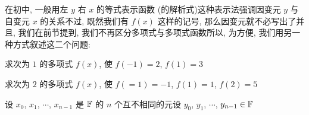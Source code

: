 在初中, 一般用左 $y$ 右 $x$ 的等式表示函数 (的解析式)\period 这种表示法强调因变元  $y$ 与自变元  $x$ 的关系\period 不过, 既然我们有 $f(x)$ 这样的记号, 那么因变元就不必写出了\period 并且, 我们在前节提到, 我们不再区分多项式与多项式函数\period 所以, 为方便, 我们用另一种方式叙述这二个问题:

\begin{example}
    求次为 $1$ 的多项式 $f(x)$, 使 $f(-1)=2$, $f(1)=3$\period
\end{example}

\begin{example}
    求次为 $2$ 的多项式 $f(x)$, 使 $f(=1)=-1$, $f(1)=1$, $f(2)=5$\period
\end{example}

设 $x_0$, $x_1$, $\cdots$, $x_{n-1}$ 是 $\mathbb{F}$ 的 $n$ 个互不相同的元\period 设 $y_0$, $y_1$, $\cdots$, $y_{n-1} \in \mathbb{F}$\period
